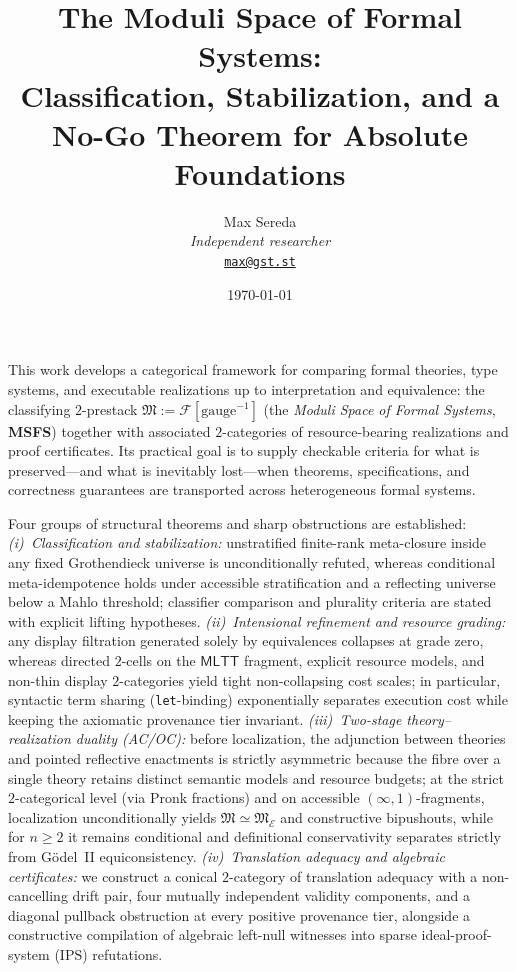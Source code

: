 \documentclass[11pt]{article}
\title{The Moduli Space of Formal Systems:\\
Classification, Stabilization, and a No-Go Theorem for Absolute Foundations}
\author{%
  \footnotesize Max Sereda \\[-3pt]
  \scriptsize\textit{Independent researcher} \\[-3pt]
  \scriptsize\texttt{\href{mailto:max@gst.st}{max@gst.st}}%
}
\date{\scriptsize\today}
\theoremstyle{plain}
\theoremstyle{definition}
\newcommand{\cF}{\mathcal{F}}
\newcommand{\fM}{\mathfrak{M}}
\newcommand{\MLTT}{\mathsf{MLTT}}
\newcommand{\cE}{\mathcal{E}}
\renewenvironment{abstract}{%
  \small
  \begin{center}\bfseries \abstractname\end{center}\vspace{-0.55em}%
  \list{}{\leftmargin=0.45em \rightmargin=0.45em \topsep=0pt \partopsep=0pt \parsep=1.5pt \listparindent=1.2em}%
  \item\relax
}{\endlist}
\begin{document}
\maketitle

\begin{abstract}
This work develops a categorical framework for comparing formal theories, type systems, and executable realizations up to interpretation and equivalence: the classifying $2$-prestack $\fM := \cF[\mathrm{gauge}^{-1}]$ (the \emph{Moduli Space of Formal Systems}, \textbf{MSFS}) together with associated $2$-categories of resource-bearing realizations and proof certificates. Its practical goal is to supply checkable criteria for what is preserved---and what is inevitably lost---when theorems, specifications, and correctness guarantees are transported across heterogeneous formal systems.

Four groups of structural theorems and sharp obstructions are established:
\emph{(i)~Classification and stabilization:} unstratified finite-rank meta-closure inside any fixed Grothendieck universe is unconditionally refuted, whereas conditional meta-idempotence holds under accessible stratification and a reflecting universe below a Mahlo threshold; classifier comparison and plurality criteria are stated with explicit lifting hypotheses.
\emph{(ii)~Intensional refinement and resource grading:} any display filtration generated solely by equivalences collapses at grade zero, whereas directed $2$-cells on the $\MLTT$ fragment, explicit resource models, and non-thin display $2$-categories yield tight non-collapsing cost scales; in particular, syntactic term sharing (\texttt{let}-binding) exponentially separates execution cost while keeping the axiomatic provenance tier invariant.
\emph{(iii)~Two-stage theory--realization duality (AC/OC):} before localization, the adjunction between theories and pointed reflective enactments is strictly asymmetric because the fibre over a single theory retains distinct semantic models and resource budgets; at the strict $2$-categorical level (via Pronk fractions) and on accessible $(\infty, 1)$-fragments, localization unconditionally yields $\fM \simeq \fM_\cE$ and constructive bipushouts, while for $n \ge 2$ it remains conditional and definitional conservativity separates strictly from G\"odel~II equiconsistency.
\emph{(iv)~Translation adequacy and algebraic certificates:} we construct a conical $2$-category of translation adequacy with a non-cancelling drift pair, four mutually independent validity components, and a diagonal pullback obstruction at every positive provenance tier, alongside a constructive compilation of algebraic left-null witnesses into sparse ideal-proof-system ($\mathrm{IPS}$) refutations.


\end{abstract}
\end{document}
